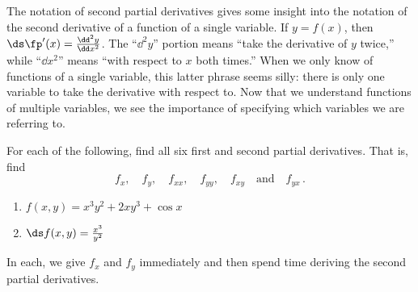 The notation of second partial derivatives gives some insight into the notation of the second derivative of a function of a single variable. If $y=f(x)$, then $\ds \fp'(x) = \frac{\dd^2 y}{\dd x^2}$. The ``$\dd^2y$'' portion means ``take the derivative of $y$ twice,'' while ``$\dd x^2$'' means ``with respect to $x$ both times.'' When we only know of functions of a single variable, this latter phrase seems silly: there is only one variable to take the derivative with respect to. Now that we understand functions of multiple variables, we see the importance of specifying which variables we are referring to.

\begin{example}\label{ex_partial6}
For each of the following, find all six first and second partial derivatives. That is, find 
\[f_x,\quad f_y,\quad f_{xx},\quad f_{yy},\quad f_{xy}\quad \text{and}\quad f_{yx}\,.\]
\begin{enumerate}
	\item $f(x,y) = x^3y^2 + 2xy^3+\cos x$
	\item	$\ds f(x,y) = \frac{x^3}{y^2}$
\end{enumerate}
\solution
In each, we give $f_x$ and $f_y$ immediately and then spend time deriving the second partial derivatives.
\end{example}
